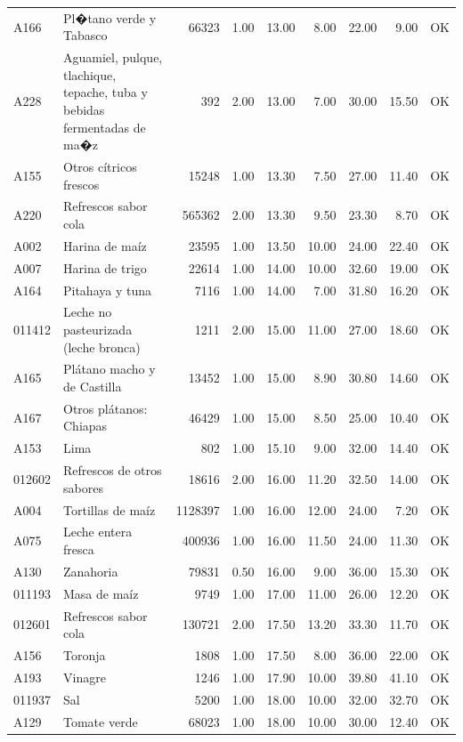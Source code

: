 \begin{table}[ht]
\begin{tabular}{llrrrrrrl}
  A166 & Pl�tano verde y Tabasco & 66323 & 1.00 & 13.00 & 8.00 & 22.00 & 9.00 & OK \\ 
  A228 & Aguamiel, pulque, tlachique, tepache, tuba y bebidas fermentadas de ma�z & 392 & 2.00 & 13.00 & 7.00 & 30.00 & 15.50 & OK \\ 
  A155 & Otros cítricos frescos & 15248 & 1.00 & 13.30 & 7.50 & 27.00 & 11.40 & OK \\ 
  A220 & Refrescos sabor cola & 565362 & 2.00 & 13.30 & 9.50 & 23.30 & 8.70 & OK \\ 
  A002 & Harina de maíz & 23595 & 1.00 & 13.50 & 10.00 & 24.00 & 22.40 & OK \\ 
  A007 & Harina de trigo & 22614 & 1.00 & 14.00 & 10.00 & 32.60 & 19.00 & OK \\ 
  A164 & Pitahaya y tuna & 7116 & 1.00 & 14.00 & 7.00 & 31.80 & 16.20 & OK \\ 
  011412 & Leche no pasteurizada (leche bronca) & 1211 & 2.00 & 15.00 & 11.00 & 27.00 & 18.60 & OK \\ 
  A165 & Plátano macho y de Castilla & 13452 & 1.00 & 15.00 & 8.90 & 30.80 & 14.60 & OK \\ 
  A167 & Otros plátanos: Chiapas & 46429 & 1.00 & 15.00 & 8.50 & 25.00 & 10.40 & OK \\ 
  A153 & Lima & 802 & 1.00 & 15.10 & 9.00 & 32.00 & 14.40 & OK \\ 
  012602 & Refrescos de otros sabores & 18616 & 2.00 & 16.00 & 11.20 & 32.50 & 14.00 & OK \\ 
  A004 & Tortillas de maíz & 1128397 & 1.00 & 16.00 & 12.00 & 24.00 & 7.20 & OK \\ 
  A075 & Leche entera fresca & 400936 & 1.00 & 16.00 & 11.50 & 24.00 & 11.30 & OK \\ 
  A130 & Zanahoria & 79831 & 0.50 & 16.00 & 9.00 & 36.00 & 15.30 & OK \\ 
  011193 & Masa de maíz & 9749 & 1.00 & 17.00 & 11.00 & 26.00 & 12.20 & OK \\ 
  012601 & Refrescos sabor cola & 130721 & 2.00 & 17.50 & 13.20 & 33.30 & 11.70 & OK \\ 
  A156 & Toronja & 1808 & 1.00 & 17.50 & 8.00 & 36.00 & 22.00 & OK \\ 
  A193 & Vinagre & 1246 & 1.00 & 17.90 & 10.00 & 39.80 & 41.10 & OK \\ 
  011937 & Sal & 5200 & 1.00 & 18.00 & 10.00 & 32.00 & 32.70 & OK \\ 
  A129 & Tomate verde & 68023 & 1.00 & 18.00 & 10.00 & 30.00 & 12.40 & OK \\ 

\end{tabular}
\end{table}
